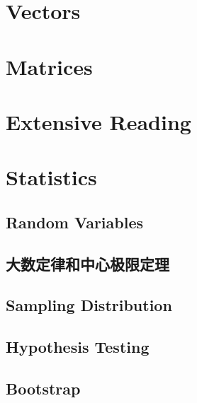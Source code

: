 \ifdefined\printmath

\part{Vectors}







\part{Matrices}




\part{Extensive Reading}



\part{Statistics}
\chapter{Random Variables}


\chapter{大数定律和中心极限定理}


\chapter{Sampling Distribution}


\chapter{Hypothesis Testing}


\chapter{Bootstrap}

\fi
